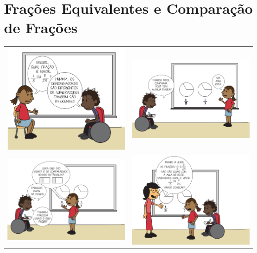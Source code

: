 

\setcounter{chapter}{3}
\chapter{Frações Equivalentes e Comparação de Frações }
\setcounter{subsection}{0}


\noindent\begin{tabular}{cc}
\includegraphics[width=.37\textwidth, keepaspectratio]{../media/cap4/secoes/pngs/quadrinho_01.png} &
\includegraphics[width=.45\textwidth, keepaspectratio]{../media/cap4/secoes/pngs/quadrinho_02.png} \\
\includegraphics[width=.45\textwidth, keepaspectratio]{../media/cap4/secoes/pngs/quadrinho_03.png} &
\includegraphics[width=.45\textwidth, keepaspectratio]{../media/cap4/secoes/pngs/quadrinho_04.png}
         \end{tabular}

